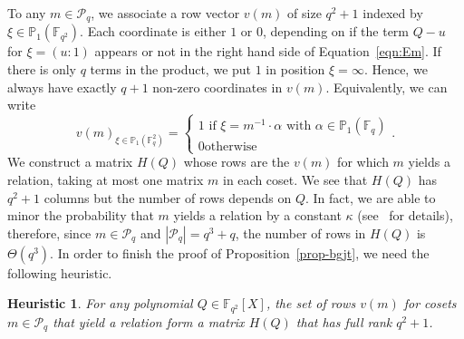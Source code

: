 \documentclass[a4paper,11pt]{article}
\theoremstyle{break}
\newtheorem{heur}[thm]{Heuristic}
\theoremstyle{sc}
\theoremstyle{definition}
\theoremstyle{remark}
\begin{document}
To any $m\in\mathcal P_q$, we associate a row vector $v(m)$ of size $q^2+1$
indexed by $\xi\in\mathbb{P}_1(\mathbb{F}_{q^2})$. Each coordinate is either $1$
or $0$, depending on if the term $Q-u$ for $\xi=(u:1)$ appears or not in the
right hand side of Equation~\eqref{eqn:Em}. If there
is only $q$ terms in the product, we put $1$ in position $\xi=\infty$. Hence, we
always have exactly $q+1$ non-zero coordinates in $v(m)$. Equivalently, we can
write
\[
  v(m)_{\xi\in\mathbb{P}_1(\mathbb{F}_q^2)}=\begin{cases} 1\text{ if
    }\xi=m^{-1}\cdot\alpha\text{ with }\alpha\in\mathbb{P}_1(\mathbb{F}_q) \\ 0\text{
    otherwise} \end{cases}.
\]
We construct a matrix $H(Q)$ whose rows are the $v(m)$ for which $m$ yields a
relation, taking at most one matrix $m$ in each coset. We see that $H(Q)$ has
$q^2+1$ columns but the number of rows depends on $Q$. In fact, we are able to
minor the probability that $m$ yields a relation by a constant $\kappa$
(see~\cite{BGJT13} for details),
therefore, since $m\in\mathcal P_q$ and $|\mathcal P_q|=q^3+q$, the number of
rows in $H(Q)$ is $\Theta(q^3)$. In order to finish the proof of
Proposition~\ref{prop-bgjt}, we need the following heuristic.
\begin{heur}
  For any polynomial $Q\in\mathbb{F}_{q^{2}}[X]$, the set of rows $v(m)$ for
  cosets $m\in\mathcal P_q$ that yield a relation form a matrix $H(Q)$ that has
  full rank $q^2+1$.
\end{heur}
\end{document}
